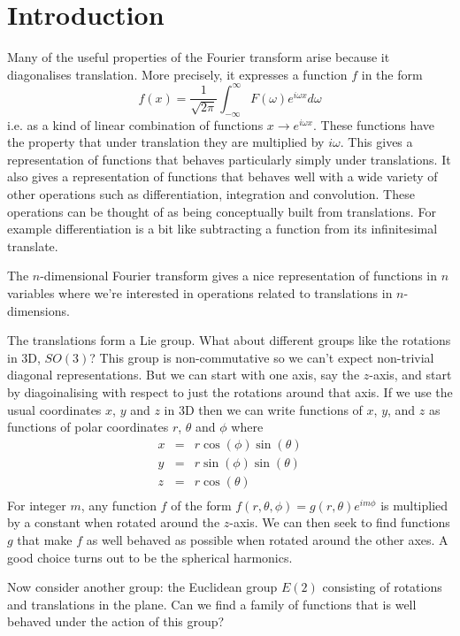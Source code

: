\documentclass{article}
\begin{document}
\section{Introduction}
Many of the useful properties of the Fourier transform arise because it diagonalises translation.
More precisely, it expresses a function $f$ in the form
\[
f(x) = \frac{1}{\sqrt{2\pi}}\int_{-\infty}^\infty F(\omega)e^{i\omega x}d\omega
\]
i.e. as a kind of linear combination of functions $x\rightarrow e^{i\omega x}$.
These functions have the property that under translation they are multiplied by $i\omega$.
This gives a representation of functions that behaves particularly simply under translations.
It also gives a representation of functions that behaves well with a wide variety of other operations such as differentiation, integration and convolution.
These operations can be thought of as being conceptually built from translations.
For example differentiation is a bit like subtracting a function from its infinitesimal translate.

The $n$-dimensional Fourier transform gives a nice representation of functions in $n$ variables where we're interested in operations related to translations in $n$-dimensions.

The translations form a Lie group.
What about different groups like the rotations in 3D, $SO(3)$?
This group is non-commutative so we can't expect non-trivial diagonal representations.
But we can start with one axis, say the $z$-axis, and start by diagoinalising with respect to just the rotations around that axis.
If we use the usual coordinates $x$, $y$ and $z$ in 3D then we can write functions of $x$, $y$, and $z$ as functions of polar coordinates $r$, $\theta$ and $\phi$ where
\begin{align*}
x & = & r\cos(\phi)\sin(\theta) \\
y & = & r\sin(\phi)\sin(\theta) \\
z & = & r\cos(\theta) \\
\end{align*}
For integer $m$, any function $f$ of the form $f(r,\theta,\phi) = g(r,\theta)e^{im\phi}$ is multiplied by a constant when rotated around the $z$-axis.
We can then seek to find functions $g$ that make $f$ as well behaved as possible when rotated around the other axes.
A good choice turns out to be the spherical harmonics.

Now consider another group: the Euclidean group $E(2)$ consisting of rotations and translations in the plane.
Can we find a family of functions that is well behaved under the action of this group?
\end{document}
